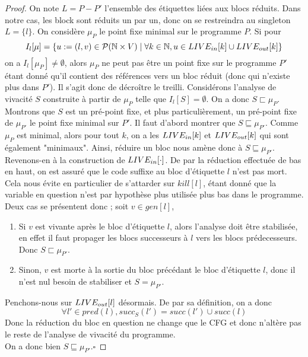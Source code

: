 \documentclass[a4paper, 12pt]{article}
\begin{document}
\\
\\
\begin{proof}
	On note $L=P - P'$ l'ensemble des étiquettes liées aux blocs réduits. Dans notre cas, les block sont réduits un par un, donc on se restreindra au 
	singleton $L = \{l\}$. On considère $\mu_P$ le point fixe minimal sur le programme $P$.
		Si pour
	\[I_l[\mu] = \{u := (l, v) \in \mathcal{P}(\mathbb{N} \times V) \mid \forall k \in \mathbb{N}, u \in LIVE_{in}[k] \cup LIVE_{out}[k]\}\]
	on a $I_l[\mu_P] \ne \emptyset$, alors $\mu_P$ ne peut pas être un point fixe sur le programme $P'$ étant donné qu'il contient des références vers un bloc réduit
	(donc qui n'existe plus dans $P'$).
	Il s'agit donc de décroître le treilli. Considérons l'analyse de vivacité $S$ construite à partir de $\mu_P$ telle que $I_l[S] = \emptyset$. On a donc 
	$S \sqsubset \mu_P$. 
	\\
	Montrons que $S$ est un pré-point fixe, et plus particulièrement, un pré-point fixe de $\mu_{P'}$ le point fixe minimal sur $P'$.
	Il faut d'abord montrer que $S \sqsubseteq \mu_{P'}$. Comme $\mu_P$ est minimal, alors pour tout $k$, on a les $LIVE_{in}[k]$ et $LIVE_{out}[k]$ qui sont également
	"minimaux". Ainsi, réduire un bloc nous amène donc à $S \sqsubseteq \mu_{P'}$. 
	Revenons-en à la construction de $LIVE_{in}[\cdot]$. De par la réduction effectuée de bas en haut, on est assuré que le code suffixe au bloc d'étiquette $l$ n'est
	pas mort. Cela nous évite en particulier de s'attarder sur $kill[l]$, étant donné que la variable en question n'est par hypothèse plus utilisée plus bas dans le
	programme. Deux cas se présentent donc ; soit $v \in gen[l]$,
	\begin{enumerate}
		\item Si $v$ est vivante après le bloc d'étiquette $l$, alors l'analyse doit être stabilisée, en effet il faut propager les blocs successeurs à $l$ vers les
		blocs prédecesseurs. Donc $S \sqsubset \mu_{P'}$.
		\item Sinon, $v$ est morte à la sortie du bloc précédant le bloc d'étiquette $l$, donc il n'est nul besoin de stabiliser et $S = \mu_{P'}$.
	\end{enumerate}
	Penchons-nous sur $LIVE_{out}[l]$ désormais. De par sa définition, on a donc 
	\[\forall l' \in pred(l), succ_{S}(l') = succ(l') \cup succ(l) \]
	Donc la réduction du bloc en question ne change que le CFG et donc n'altère pas le reste de l'analyse de vivacité du programme.
	\\
	On a donc bien $S \sqsubseteq \mu_{P'}$.\hfill$\square$
\end{proof}
\end{document}
